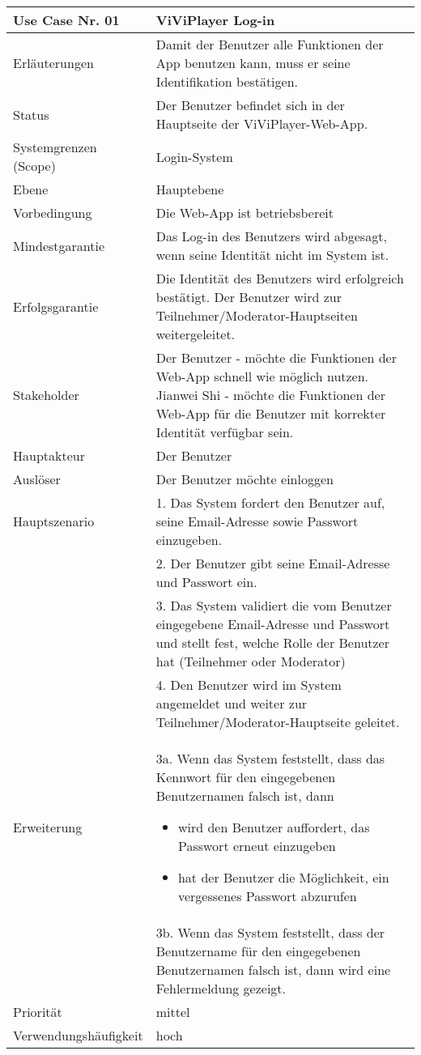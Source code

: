 \begin{tabularx}{\linewidth}{|l|X|}
	\hline
	Use Case Nr. 01			& \textbf{ViViPlayer Log-in} \\ \hline
	Erläuterungen			& Damit der Benutzer alle Funktionen der App benutzen kann, 
							  muss er seine Identifikation bestätigen. \\ \hline
	Status					& Der Benutzer befindet sich in der Hauptseite der ViViPlayer-Web-App. \\ \hline
	Systemgrenzen (Scope)	& Login-System \\ \hline
	Ebene					& Hauptebene \\ \hline
	Vorbedingung			& Die Web-App ist betriebsbereit \\ \hline
	Mindestgarantie			& Das Log-in des Benutzers wird abgesagt, wenn seine Identität nicht im System ist. \\ \hline
	Erfolgsgarantie			& Die Identität des Benutzers wird erfolgreich bestätigt. Der Benutzer
							  wird zur Teilnehmer/Moderator-Hauptseiten weitergeleitet. \\ \hline
	Stakeholder				& Der Benutzer - möchte die Funktionen der Web-App schnell wie möglich nutzen. \newline
							  Jianwei Shi - möchte die Funktionen der Web-App für die Benutzer mit korrekter Identität
							  verfügbar sein.\\ \hline
	Hauptakteur				& Der Benutzer \\ \hline
	Auslöser				& Der Benutzer möchte einloggen \\ \hline	
	Hauptszenario			& 1. Das System fordert den Benutzer auf, seine Email-Adresse sowie Passwort einzugeben. \\
							& 2. Der Benutzer gibt seine Email-Adresse und Passwort ein. \\
							& 3. Das System validiert die vom Benutzer eingegebene Email-Adresse und Passwort und  stellt fest, welche Rolle der Benutzer hat (Teilnehmer oder Moderator) \\
							& 4. Den Benutzer wird im System angemeldet und weiter zur Teilnehmer/Moderator-Hauptseite
								 geleitet. \\ \hline
	Erweiterung				& 3a. Wenn das System feststellt, dass das Kennwort für den eingegebenen Benutzernamen falsch
							  ist, dann
							  \begin{itemize}
							  	\item wird den Benutzer auffordert, das Passwort erneut einzugeben 
							  	\item hat der Benutzer die Möglichkeit, ein vergessenes Passwort abzurufen 
							  \end{itemize} \\
							& 3b.  Wenn das System feststellt, dass der Benutzername für den eingegebenen Benutzernamen
							falsch ist, dann wird eine Fehlermeldung gezeigt. \\ \hline
	Priorität				& mittel \\ \hline
	Verwendungshäufigkeit	& hoch \\ \hline
\end{tabularx}
